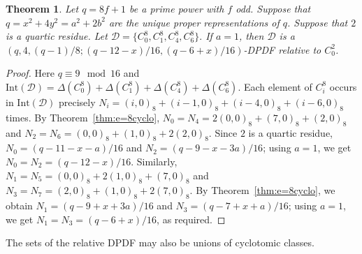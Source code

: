 \documentclass[12pt, a4paper]{article}
\newtheorem{theorem}{Theorem}[section]
\theoremstyle{definition}
\begin{document}
\begin{theorem}\label{thm:DPDF-single0146}
Let $q=8f+1$ be a prime power with $f$ odd. Suppose that
$q=x^2+4y^2=a^2+2b^2$ are the unique proper representations of $q$. Suppose that $2$ is a
	quartic residue. Let
	$
	\mathcal D=\{C_0^8,C_1^8,C_4^8,C_6^8\}.
	$
	If $a=1$, then $\mathcal D$ is a
	$
	(q,4,(q-1)/8;(q-12-x)/16,(q-6+x)/16)
	$-DPDF
	relative to $C_0^2$.
\end{theorem}

\begin{proof}
Here $q \equiv 9 \mod 16$ and $\mathrm{Int}(\mathcal D)
=\Delta(C_0^8)+\Delta(C_1^8)+\Delta(C_4^8)+\Delta(C_6^8)$.  Each element of $C_i^8$ occurs in $\mathrm{Int}(\mathcal D)$ precisely $N_i=(i,0)_8+(i-1,0)_8+(i-4,0)_8+(i-6,0)_8$ times. By Theorem~\ref{thm:e=8cyclo}, $N_0=N_4=2(0,0)_8+(7,0)_8+(2,0)_8$ and $N_2=N_6=(0,0)_8+(1,0)_8+2(2,0)_8$.  Since $2$ is a quartic residue,
$N_0=(q-11-x-a)/16$ and $N_2=(q-9-x-3a)/16$; using $a=1$, we get $N_0=N_2=(q-12-x)/16$.  Similarly,
$N_1=N_5=(0,0)_8+2(1,0)_8+(7,0)_8$ and $N_3=N_7=(2,0)_8+(1,0)_8+2(7,0)_8$. By Theorem~\ref{thm:e=8cyclo}, we obtain $N_1=(q-9+x+3a)/16$
and $N_3=(q-7+x+a)/16$; using $a=1$, we get $N_1=N_3=(q-6+x)/16$, as required.
\end{proof}

The sets of the relative DPDF may also be unions of cyclotomic classes.
\end{document}
